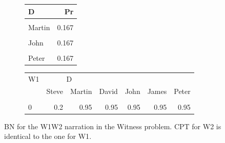 \documentclass[10pt,]{scrartcl}
\begin{document}
\begin{figure}

\begin{subfigure}[!ht]{0.3\textwidth}
\begin{table}[H]
\centering
\begin{tabular}{lr}
\toprule
D & Pr\\
\midrule
\cellcolor{gray!6}{Steve} & \cellcolor{gray!6}{0.167}\\
Martin & 0.167\\
\cellcolor{gray!6}{David} & \cellcolor{gray!6}{0.167}\\
John & 0.167\\
\cellcolor{gray!6}{James} & \cellcolor{gray!6}{0.167}\\
Peter & 0.167\\
\bottomrule
\end{tabular}
\end{table}
\end{subfigure}
\begin{subfigure}[!ht]{0.2\textwidth}
\begin{table}[H]
\centering\begin{table}[H]
\centering
\begin{tabular}{lrrrrrr}
\toprule
\multicolumn{1}{c}{W1} & \multicolumn{2}{c}{D} \\
  & Steve & Martin & David & John & James & Peter\\
\midrule
\cellcolor{gray!6}{\cellcolor{gray!6}{1}} & \cellcolor{gray!6}{\cellcolor{gray!6}{0.8}} & \cellcolor{gray!6}{\cellcolor{gray!6}{0.05}} & \cellcolor{gray!6}{\cellcolor{gray!6}{0.05}} & \cellcolor{gray!6}{\cellcolor{gray!6}{0.05}} & \cellcolor{gray!6}{\cellcolor{gray!6}{0.05}} & \cellcolor{gray!6}{\cellcolor{gray!6}{0.05}}\\
0 & 0.2 & 0.95 & 0.95 & 0.95 & 0.95 & 0.95\\
\bottomrule
\end{tabular}
\end{table}
\end{table}
\end{subfigure}
\caption{BN for the \textsf{W1W2} narration in the \textsf{Witness} problem. CPT for \textsf{W2} is identical to the one for \textsf{W1}.}
\label{fig:w1w2}
\end{figure}


\end{document}
